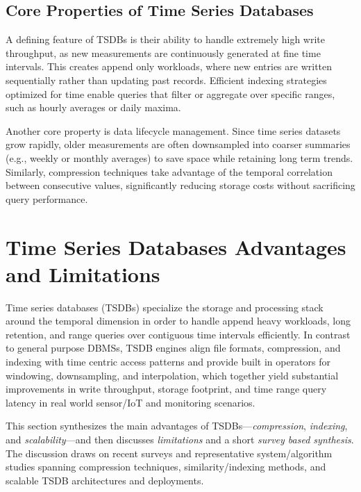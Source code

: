 \subsection{Core Properties of Time Series Databases} A defining feature of
TSDBs is their ability to handle extremely high write throughput, as new
measurements are continuously generated at fine time intervals. This creates
append only workloads, where new entries are written sequentially rather than
updating past records\cite{Andersen2016}. Efficient indexing strategies
optimized for time enable queries that filter or aggregate over specific
ranges, such as hourly averages or daily maxima.

Another core property is data lifecycle management. Since time series datasets
grow rapidly, older measurements are often downsampled into coarser summaries
(e.g., weekly or monthly averages) to save space while retaining long term
trends\cite{Mostafa2022}. Similarly, compression techniques take advantage of
the temporal correlation between consecutive values, significantly reducing
storage costs without sacrificing query performance.

\section{Time Series Databases Advantages and
  Limitations}\label{sec:time-series-databases-advantages-and-limitations}

Time series databases (TSDBs) specialize the storage and processing stack
around the temporal dimension in order to handle append heavy workloads, long
retention, and range queries over contiguous time intervals
efficiently\cite{Jensen2017}. In contrast to general purpose DBMSs, TSDB
engines align file formats, compression, and indexing with time centric access
patterns and provide built in operators for windowing, downsampling, and
interpolation, which together yield substantial improvements in write
throughput, storage footprint, and time range query latency in real world
sensor/IoT and monitoring scenarios\cite{Jensen2017,Jensen2022}.

This section synthesizes the main advantages of TSDBs—\emph{compression},
\emph{indexing}, and \emph{scalability}—and then discusses \emph{limitations}
and a short \emph{survey based synthesis}. The discussion draws on recent
surveys and representative system/algorithm studies spanning compression
techniques\cite{Chiarot2023,Eichinger2015,Iqbal2021}, similarity/indexing
methods\cite{Faloutsos1994,Keogh1999,Keogh2001}, and scalable TSDB
architectures and deployments\cite{Wang2020,Goldschmidt2014,Duarte2019}.

